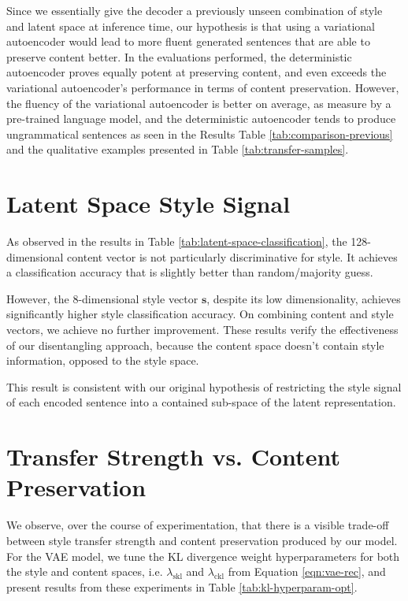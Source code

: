 Since we essentially give the decoder a previously unseen combination of style and latent space at inference time, our hypothesis is that using a variational autoencoder would lead to more fluent generated sentences that are able to preserve content better. In the evaluations performed, the deterministic autoencoder proves equally potent at preserving content, and even exceeds the variational autoencoder's performance in terms of content preservation. However, the fluency of the variational autoencoder is better on average, as measure by a pre-trained language model, and the deterministic autoencoder tends to produce ungrammatical sentences as seen in the Results Table \ref{tab:comparison-previous} and the qualitative examples presented in Table \ref{tab:transfer-samples}.


\section{Latent Space Style Signal}

As observed in the results in Table \ref{tab:latent-space-classification}, the 128-dimensional content vector is not particularly discriminative for style. It achieves a classification accuracy that is slightly better than random/majority guess.

However, the 8-dimensional style vector $\bm s$, despite its low dimensionality, achieves significantly higher style classification accuracy. On combining content and style vectors, we achieve no further improvement. These results verify the effectiveness of our disentangling approach, because the content space doesn't contain style information, opposed to the style space.

This result is consistent with our original hypothesis of restricting the style signal of each encoded sentence into a contained sub-space of the latent representation.


\section{Transfer Strength vs. Content Preservation}

We observe, over the course of experimentation, that there is a visible trade-off between style transfer strength and content preservation produced by our model. For the VAE model, we tune the KL divergence weight hyperparameters for both the style and content spaces, i.e. $\lambda_{\text{skl}}$ and $\lambda_{\text{ckl}}$ from Equation \ref{eqn:vae-rec}, and present results from these experiments in Table \ref{tab:kl-hyperparam-opt}.

